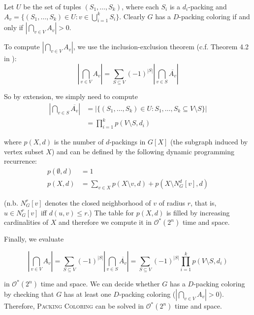 \documentclass[10pt, a4paper]{article}
\theoremstyle{definition}
\newcommand{\mcO}{\mathcal{O}}
\begin{document}
Let $U$ be the set of tuples $(S_1, \dotsc, S_k)$, where each $S_i$ is a $d_i$-packing and $A_v = \{ (S_1, \dotsc, S_k) \in U : v \in \bigcup_{i=1}^{k} S_i\}$. Clearly $G$ has a $D$-packing coloring if and only if $\left | \bigcap_{v \in V} A_v \right | > 0$.

To compute $\left | \bigcap_{v \in V} A_v \right |$, we use the inclusion-exclusion theorem (c.f. Theorem 4.2 in \cite{Fomin2010}):
\begin{equation} \label{eq:incl_excl}
	\left | \bigcap_{v \in V} A_v \right | = \sum_{S \subseteq V} (-1)^{|S|} \left | \bigcap_{v \in S} \overline{A_v} \right | 
\end{equation}

So by extension, we simply need to compute 
\begin{align*}
	\left | \bigcap_{v \in S} \overline{A_v} \right | &= \left | \{ (S_1, \dotsc, S_k) \in U : S_1, \dotsc, S_k \subseteq V \setminus S \} \right | \\
													  &= \prod_{i=1}^{k} p(V \setminus S, d_i)
\end{align*}

where $p(X, d)$ is the number of $d$-packings in $G[X]$ (the subgraph induced by vertex subset $X$) and can be defined by the following dynamic programming recurrence:
\begin{align*}
	p(\emptyset, d) &= 1 \\
	p(X, d) &= \sum_{v \in X} p(X \setminus {v}, d) + p(X \setminus N_G^d[v], d)   
\end{align*}

(n.b. $N_G^r[v]$ denotes the closed neighborhood of $v$ of radius $r$, that is, $u \in N_G^r[v]$ iff $d(u, v) \leq r$.) The table for $p(X, d)$ is filled by increasing cardinalities of $X$ and therefore we compute it in $\mcO^*(2^n)$ time and space. 

Finally, we evaluate

\begin{equation} \label{eq:incl_excl_final}
	\left | \bigcap_{v \in V} A_v \right | 
	= \sum_{S \subseteq V} (-1)^{|S|} \left | \bigcap_{v \in S} \overline{A_v} \right | 
	= \sum_{S \subseteq V} (-1)^{|S|} \prod_{i=1}^{k} p(V \setminus S, d_i)
\end{equation}

in $\mcO^*(2^n)$ time and space. We can decide whether $G$ has a $D$-packing coloring by checking that $G$ has at least one $D$-packing coloring ($\left | \bigcap_{v \in V} A_v \right | > 0$). Therefore, \textsc{Packing Coloring} can be solved in $\mcO^*(2^n)$ time and space.
\end{document}
